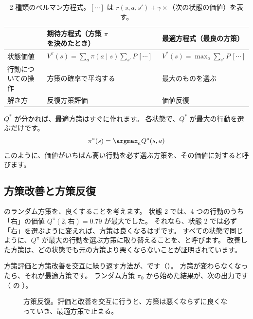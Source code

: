 \begin{table}[tbp]
\centering
\caption{2 種類のベルマン方程式。$[\cdots]$ は $r(s,a,s')+\gamma\times$（次の状態の価値）を表す。}
\label{tab:rlb-bellman}
\small
\begin{tabular}{lll}
\toprule
 & 期待方程式（方策 $\pi$ を決めたとき） & 最適方程式（最良の方策） \\
\midrule
状態価値 & $V^\pi(s)=\sum_a\pi(a\mid s)\sum_{s'}P\,[\cdots]$ & $V^\ast(s)=\max_a\sum_{s'}P\,[\cdots]$ \\
行動についての操作 & 方策の確率で平均する & 最大のものを選ぶ \\
解き方 & 反復方策評価 & 価値反復 \\
\bottomrule
\end{tabular}
\end{table}

$Q^\ast$ が分かれば、最適方策はすぐに作れます。
各状態で、$Q^\ast$ が最大の行動を選ぶだけです。
\begin{equation}
\pi^\ast(s)=\argmax_a Q^\ast(s,a)
\label{eq:rlb-greedy}
\end{equation}
このように、価値がいちばん高い行動を必ず選ぶ方策を、その価値に対すると呼びます。

\subsection*{方策改善と方策反復}

のランダム方策を、良くすることを考えます。
状態 2 では、4 つの行動のうち「右」の価値 $Q^\pi(2,\text{右})=0.79$ が最大でした。
それなら、状態 2 では必ず「右」を選ぶように変えれば、方策は良くなるはずです。
すべての状態で同じように、$Q^\pi$ が最大の行動を選ぶ方策に取り替えることを、と呼びます。
改善した方策は、どの状態でも元の方策より悪くならないことが証明されています\cite{sutton2018rl}。

方策評価と方策改善を交互に繰り返す方法が、です（）。
方策が変わらなくなったら、それが最適方策です。
ランダム方策 $\pi_0$ から始めた結果が、次の出力です（ の ）。

\begin{figure}[tbp]
\centering
{}
\caption{方策反復。評価と改善を交互に行うと、方策は悪くならずに良くなっていき、最適方策で止まる。}
\label{fig:rlb-gpi}
\end{figure}

